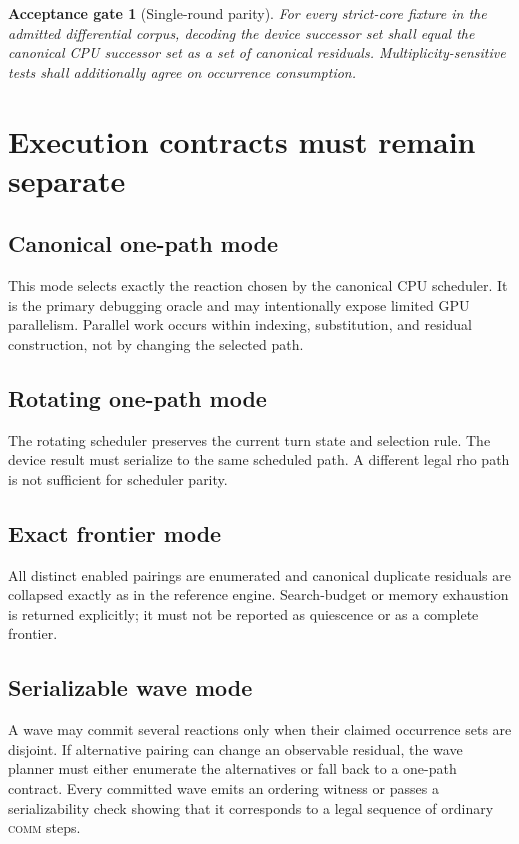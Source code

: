 \documentclass[11pt]{article}
\newtheorem{acceptance}[requirement]{Acceptance gate}
\newcommand{\COMM}{\textsc{comm}}
\begin{document}
\begin{acceptance}[Single-round parity]
For every strict-core fixture in the admitted differential corpus, decoding
the device successor set shall equal the canonical CPU successor set as a set
of canonical residuals.  Multiplicity-sensitive tests shall additionally
agree on occurrence consumption.
\end{acceptance}

\section{Execution contracts must remain separate}

\subsection{Canonical one-path mode}

This mode selects exactly the reaction chosen by the canonical CPU scheduler.
It is the primary debugging oracle and may intentionally expose limited GPU
parallelism.  Parallel work occurs within indexing, substitution, and
residual construction, not by changing the selected path.

\subsection{Rotating one-path mode}

The rotating scheduler preserves the current turn state and selection rule.
The device result must serialize to the same scheduled path.  A different
legal rho path is not sufficient for scheduler parity.

\subsection{Exact frontier mode}

All distinct enabled pairings are enumerated and canonical duplicate
residuals are collapsed exactly as in the reference engine.  Search-budget or
memory exhaustion is returned explicitly; it must not be reported as
quiescence or as a complete frontier.

\subsection{Serializable wave mode}

A wave may commit several reactions only when their claimed occurrence sets
are disjoint.  If alternative pairing can change an observable residual, the
wave planner must either enumerate the alternatives or fall back to a one-path
contract.  Every committed wave emits an ordering witness or passes a
serializability check showing that it corresponds to a legal sequence of
ordinary \COMM{} steps.
\end{document}

